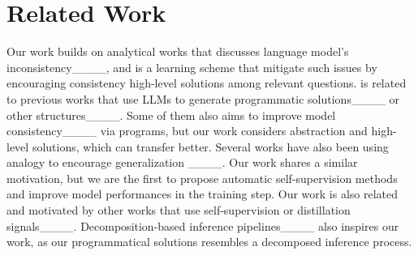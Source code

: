 \section{Related Work}
Our work builds on analytical works that discusses language model's inconsistency____, and \framework{} is a learning scheme that mitigate such issues by encouraging consistency high-level solutions among relevant questions. \framework{} is related to previous works that use LLMs to generate programmatic solutions____ or other structures____. Some of them also aims to improve model consistency____ via programs, but our work considers abstraction and high-level solutions, which can transfer better. Several works have also been using analogy to encourage generalization ____. Our work shares a similar motivation, but we are the first to propose automatic self-supervision methods and improve model performances in the training step. Our work is also related and motivated by other works that use self-supervision or distillation signals____. Decomposition-based inference pipelines____ also inspires our work, as our programmatical solutions resembles a decomposed inference process.

